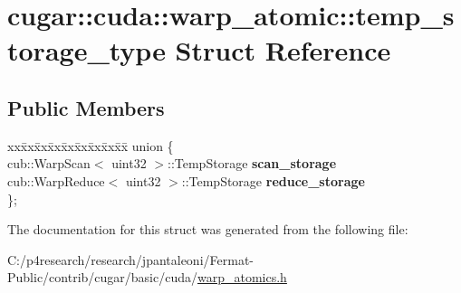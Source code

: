 \hypertarget{structcugar_1_1cuda_1_1warp__atomic_1_1temp__storage__type}{}\section{cugar\+:\+:cuda\+:\+:warp\+\_\+atomic\+:\+:temp\+\_\+storage\+\_\+type Struct Reference}
\label{structcugar_1_1cuda_1_1warp__atomic_1_1temp__storage__type}
\subsection*{Public Members}
\begin{DoxyCompactItemize}
\item 
\mbox{\label{structcugar_1_1cuda_1_1warp__atomic_1_1temp__storage__type_abbff07b8615d5278fc9050896668fb2e}} 
\begin{tabbing}
xx\=xx\=xx\=xx\=xx\=xx\=xx\=xx\=xx\=\kill
union \{\\
\>cub::WarpScan$<$ uint32 $>$::TempStorage {\bfseries scan\_storage}\\
\>cub::WarpReduce$<$ uint32 $>$::TempStorage {\bfseries reduce\_storage}\\
\}; \\

\end{tabbing}\end{DoxyCompactItemize}


The documentation for this struct was generated from the following file\+:\begin{DoxyCompactItemize}
\item 
C\+:/p4research/research/jpantaleoni/\+Fermat-\/\+Public/contrib/cugar/basic/cuda/\hyperlink{warp__atomics_8h}{warp\+\_\+atomics.\+h}\end{DoxyCompactItemize}
